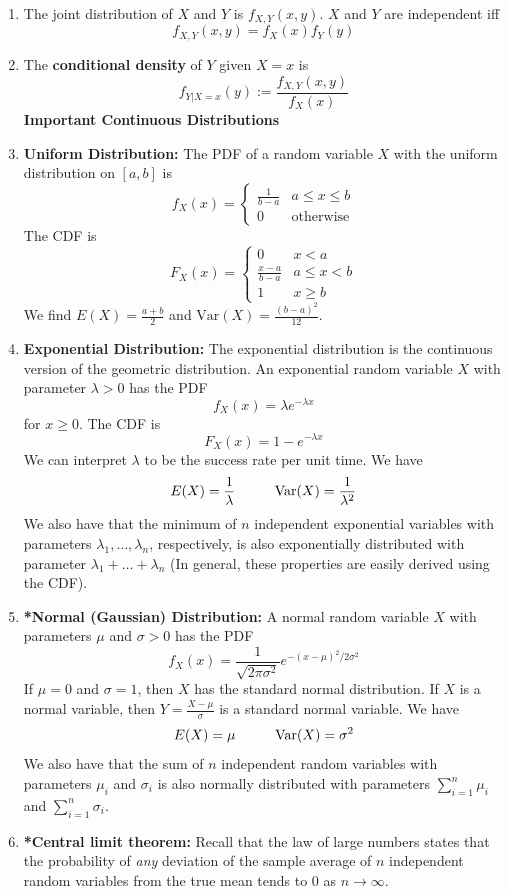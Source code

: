 \documentclass[10pt]{article}
\begin{document}
\begin{multicols}{2}
\begin{enumerate}
\begin{enumerate}
            \item The joint distribution of $X$ and $Y$ is $f_{X,Y}(x,y)$. $X$ and $Y$ are independent iff $$f_{X,Y}(x,y) = f_X(x)f_Y(y)$$
            \item The \textbf{conditional density} of $Y$ given $X=x$ is $$f_{Y|X=x}(y):=\frac{f_{X,Y}(x,y)}{f_X(x)}$$
            \textbf{Important Continuous Distributions}
            \item \textbf{Uniform Distribution:} The PDF of a random variable $X$ with the uniform distribution on $[a,b]$ is
            \[ f_X(x) =
            \begin{cases} 
                  \frac{1}{b-a} & a\leq x \leq b  \\
                  0 & \text{otherwise}
               \end{cases}
            \]
            The CDF is
            \[ F_X(x) =
            \begin{cases} 
                  0 & x < a  \\
                  \frac{x-a}{b-a} & a \leq x < b \\
                  1 & x \geq b
               \end{cases}
            \]
            We find $E(X)=\frac{a+b}{2}$ and $\text{Var}(X)=\frac{(b-a)^2}{12}$.
            \item \textbf{Exponential Distribution:} The exponential distribution is the continuous version of the geometric distribution. An exponential random variable $X$ with parameter $\lambda > 0$ has the PDF
            $$f_X(x) = \lambda e^{-\lambda x}$$ for $x\geq 0$. The CDF is $$F_X(x) = 1 - e^{-\lambda x}$$ We can interpret $\lambda$ to be the success rate per unit time. We have $$E(X) = \frac{1}{\lambda} \hspace{10mm} \text{Var}(X) = \frac{1}{\lambda^2}$$
            We also have that the minimum of $n$ independent exponential variables with parameters $\lambda_1, \ldots, \lambda_n$, respectively, is also exponentially distributed with parameter $\lambda_1+\ldots+\lambda_n$ (In general, these properties are easily derived using the CDF).
            \item \textbf{*Normal (Gaussian) Distribution:} A normal random variable $X$ with parameters $\mu$ and $\sigma>0$ has the PDF $$f_X(x) = \frac{1}{\sqrt{2\pi\sigma^2}}e^{-(x-\mu)^2 / 2\sigma^2}$$ If $\mu = 0$ and $\sigma = 1$, then $X$ has the standard normal distribution. If $X$ is a normal variable, then $Y=\frac{X-\mu}{\sigma}$ is a standard normal variable. We have $$E(X) = \mu \hspace{10mm} \text{Var}(X) = \sigma^2$$ We also have that the sum of $n$ independent random variables with parameters $\mu_i$ and $\sigma_i$ is also normally distributed with parameters $\sum_{i=1}^n \mu_i$ and $\sum_{i=1}^n \sigma_i$.
            \item \textbf{*Central limit theorem:} Recall that the law of large numbers states that the probability of \textit{any} deviation of the sample average of $n$ independent random variables from the true mean tends to 0 as $n\rightarrow\infty$. \\
            

\end{enumerate}
\end{enumerate}
\end{multicols}
\end{document}
